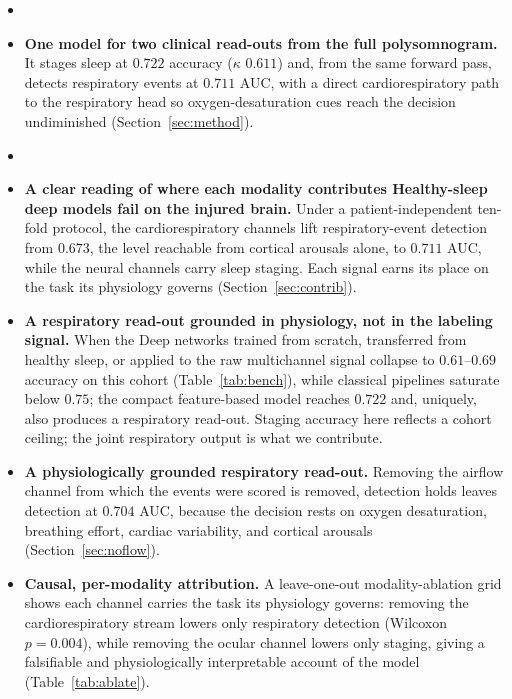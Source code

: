 \documentclass[preprint,12pt]{elsarticle}
\newcommand{\mmAcc}{0.722}
\newcommand{\mmK}{0.611}
\newcommand{\mmAuc}{0.711}
\newcommand{\eegAuc}{0.673}
\newcommand{\noflowAuc}{0.704}
\providecommand{\DIFaddtex}[1]{{\protect\color{blue} \sf #1}} %
\providecommand{\DIFdeltex}[1]{{\protect\color{red} \scriptsize #1}} %
\providecommand{\DIFaddbegin}{} %
\providecommand{\DIFaddend}{} %
\providecommand{\DIFdelbegin}{} %
\providecommand{\DIFdelend}{} %
\providecommand{\DIFadd}[1]{\texorpdfstring{\DIFaddtex{#1}}{#1}} %
\providecommand{\DIFdel}[1]{\texorpdfstring{\DIFdeltex{#1}}{}} %
\providecommand{\DIFscaledelfig}{0.5}
\newlength{\DIFdelgraphicswidth} %
\newlength{\DIFdelgraphicsheight} %
\providecommand{\DIFaddincludegraphics}[2][]{{\color{blue}\fbox{\DIFOincludegraphics[#1]{#2}}}} %
\providecommand{\DIFdelincludegraphics}[2][]{%
\sbox{\DIFdelgraphicsbox}{\DIFOincludegraphics[#1]{#2}}%
\settoboxwidth{\DIFdelgraphicswidth}{\DIFdelgraphicsbox} %
\settoboxtotalheight{\DIFdelgraphicsheight}{\DIFdelgraphicsbox} %
\scalebox{\DIFscaledelfig}{%
\parbox[b]{\DIFdelgraphicswidth}{\usebox{\DIFdelgraphicsbox}\\[-\baselineskip] \rule{\DIFdelgraphicswidth}{0em}}\llap{\resizebox{\DIFdelgraphicswidth}{\DIFdelgraphicsheight}{%
\setlength{\unitlength}{\DIFdelgraphicswidth}%
\begin{picture}(1,1)%
\thicklines\linethickness{2pt} %
{\color[rgb]{1,0,0}\put(0,0){\framebox(1,1){}}}%
{\color[rgb]{1,0,0}\put(0,0){\line( 1,1){1}}}%
{\color[rgb]{1,0,0}\put(0,1){\line(1,-1){1}}}%
\end{picture}%
}\hspace*{3pt}}} %
} %
\DeclareRobustCommand{\DIFaddbegin}{\DIFOaddbegin \let\includegraphics\DIFaddincludegraphics} %
\DeclareRobustCommand{\DIFaddend}{\DIFOaddend \let\includegraphics\DIFOincludegraphics} %
\DeclareRobustCommand{\DIFdelbegin}{\DIFOdelbegin \let\includegraphics\DIFdelincludegraphics} %
\DeclareRobustCommand{\DIFdelend}{\DIFOaddend \let\includegraphics\DIFOincludegraphics} %
\begin{document}
\begin{itemize}
\DIFdelbegin %
\item%
\DIFdelend \DIFaddbegin \item[\DIFadd{\textbf{C1.}}] \DIFaddend \textbf{One model for two clinical read-outs from the full polysomnogram.} It stages
sleep at $\mmAcc$ accuracy ($\kappa$ $\mmK$) and, from the same forward pass, detects
respiratory events at $\mmAuc$ AUC, with a direct cardiorespiratory path to the respiratory
head so oxygen-desaturation cues reach the decision undiminished (Section~\ref{sec:method}).
\DIFdelbegin %
\item%
\DIFdelend \DIFaddbegin \item[\DIFadd{\textbf{C2.}}] \DIFaddend \textbf{\DIFdelbegin \DIFdel{A clear reading of where each modality contributes}\DIFdelend \DIFaddbegin \DIFadd{Healthy-sleep deep models fail on the injured brain}\DIFaddend .} \DIFdelbegin \DIFdel{Under a
patient-independent ten-fold protocol, the cardiorespiratory channels lift respiratory-event
detection from
$\eegAuc$, the level reachable from cortical arousals alone, to $\mmAuc$
AUC, while the neural channels carry sleep staging. Each signal earns its place on the task
its physiology governs (Section~\ref{sec:contrib}).
}%
\item%
\DIFdel{\textbf{A respiratory read-out grounded in physiology, not in the labeling signal.}
When the }\DIFdelend \DIFaddbegin \DIFadd{Deep networks trained from
scratch, transferred from healthy sleep, or applied to the raw multichannel signal collapse to
$0.61$--$0.69$ accuracy on this cohort (Table~\ref{tab:bench}), while classical pipelines
saturate below $0.75$; the compact feature-based model reaches $\mmAcc$ and, uniquely, also
produces a respiratory read-out. Staging accuracy here reflects a cohort ceiling; the joint respiratory output is what we contribute.
}\item[\DIFadd{\textbf{C3.}}] \DIFadd{\textbf{A physiologically grounded respiratory read-out.}
Removing the }\DIFaddend airflow channel from which the events were scored \DIFdelbegin \DIFdel{is removed, detection holds }\DIFdelend \DIFaddbegin \DIFadd{leaves detection }\DIFaddend at
$\noflowAuc$ AUC, because the decision rests on oxygen desaturation, breathing effort,
cardiac variability, and cortical arousals (Section~\ref{sec:noflow}).
\DIFaddbegin \item[\DIFadd{\textbf{C4.}}] \DIFadd{\textbf{Causal, per-modality attribution.} A
leave-one-out modality-ablation grid shows each channel carries the task its physiology governs:
removing the cardiorespiratory stream lowers only respiratory detection (Wilcoxon $p=0.004$),
while removing the ocular channel lowers only staging, giving a falsifiable and physiologically
interpretable account of the model (Table~\ref{tab:ablate}).
}\DIFaddend \end{itemize}
\end{document}

